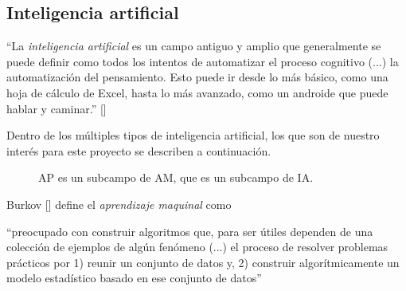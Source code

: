 \subsection {Inteligencia artificial}\label{subsec:intela}
\begin{displayquote}
``La \emph{inteligencia artificial} es un campo antiguo y amplio que generalmente se puede definir como todos los intentos de automatizar el proceso cognitivo (...) la automatización del pensamiento. Esto puede ir desde lo más básico, como una hoja de cálculo de Excel, hasta lo más avanzado, como un androide que puede hablar y caminar.'' [\cite{cho18}]
\end{displayquote}

Dentro de los múltiples tipos de inteligencia artificial, los que son de nuestro interés para este proyecto se describen a continuación.

\begin{wrapfigure}[11]{r}[0cm]{2.66cm}
	\caption[Inteligencia artificial]{AP es un subcampo de AM, que es un subcampo de IA.}\label{FIG:IA}
\end{wrapfigure}
Burkov [\citeyear{burk19}] define el \emph{aprendizaje maquinal} como
\begin{displayquote}
``preocupado con construir algoritmos que, para ser útiles dependen de una colección de ejemplos de algún fenómeno (...) el proceso de resolver problemas prácticos por 1) reunir un conjunto de datos y, 2) construir algorítmicamente un modelo estadístico basado en ese conjunto de datos''
\end{displayquote}

